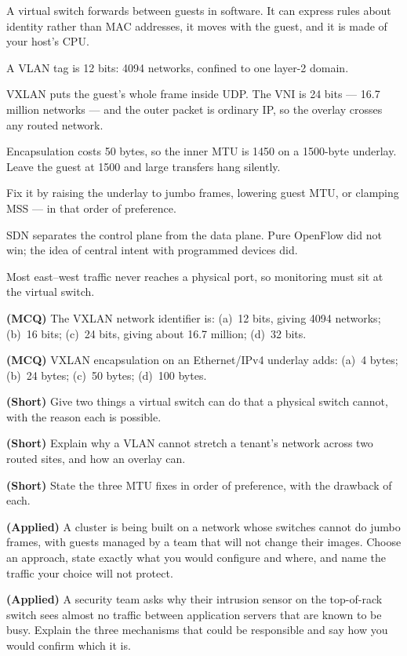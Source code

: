 \begin{chaptersummary}
\begin{tight}
  \item A virtual switch forwards between guests in software. It can express
        rules about identity rather than MAC addresses, it moves with the
        guest, and it is made of your host's CPU.
  \item A VLAN tag is 12 bits: 4094 networks, confined to one layer-2 domain.
  \item VXLAN puts the guest's whole frame inside UDP. The VNI is 24 bits ---
        16.7 million networks --- and the outer packet is ordinary IP, so the
        overlay crosses any routed network.
  \item Encapsulation costs 50 bytes, so the inner MTU is 1450 on a 1500-byte
        underlay. Leave the guest at 1500 and large transfers hang silently.
  \item Fix it by raising the underlay to jumbo frames, lowering guest MTU, or
        clamping MSS --- in that order of preference.
  \item SDN separates the control plane from the data plane. Pure OpenFlow did
        not win; the idea of central intent with programmed devices did.
  \item Most east--west traffic never reaches a physical port, so monitoring
        must sit at the virtual switch.
\end{tight}
\end{chaptersummary}

\begin{reviewq}
  \item \textbf{(MCQ)} The VXLAN network identifier is: (a)~12 bits, giving
        4094 networks; (b)~16 bits; (c)~24 bits, giving about 16.7 million;
        (d)~32 bits.
  \item \textbf{(MCQ)} VXLAN encapsulation on an Ethernet/IPv4 underlay adds:
        (a)~4 bytes; (b)~24 bytes; (c)~50 bytes; (d)~100 bytes.
  \item \textbf{(Short)} Give two things a virtual switch can do that a
        physical switch cannot, with the reason each is possible.
  \item \textbf{(Short)} Explain why a VLAN cannot stretch a tenant's network
        across two routed sites, and how an overlay can.
  \item \textbf{(Short)} State the three MTU fixes in order of preference, with
        the drawback of each.
  \item \textbf{(Applied)} A cluster is being built on a network whose switches
        cannot do jumbo frames, with guests managed by a team that will not
        change their images. Choose an approach, state exactly what you would
        configure and where, and name the traffic your choice will not
        protect.
  \item \textbf{(Applied)} A security team asks why their intrusion sensor on
        the top-of-rack switch sees almost no traffic between application
        servers that are known to be busy. Explain the three mechanisms that
        could be responsible and say how you would confirm which it is.
\end{reviewq}
